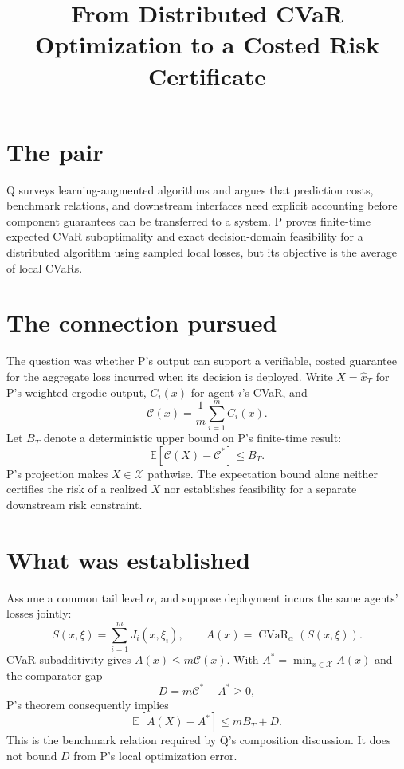 \documentclass{article}
\title{From Distributed CVaR Optimization to a Costed Risk Certificate}
\begin{document}
\maketitle

\section*{The pair}

Q surveys learning-augmented algorithms and argues that prediction costs, benchmark relations, and downstream interfaces need explicit accounting before component guarantees can be transferred to a system. P proves finite-time expected CVaR suboptimality and exact decision-domain feasibility for a distributed algorithm using sampled local losses, but its objective is the average of local CVaRs. 

\section*{The connection pursued}

The question was whether P's output can support a verifiable, costed guarantee for the aggregate loss incurred when its decision is deployed. Write \(X=\hat x_T\) for P's weighted ergodic output, \(C_i(x)\) for agent \(i\)'s CVaR, and
\[
\mathcal C(x)=\frac{1}{m}\sum_{i=1}^m C_i(x).
\]
Let \(B_T\) denote a deterministic upper bound on P's finite-time result:
\[
\mathbb E[\mathcal C(X)-\mathcal C^*]\leq B_T.
\]
P's projection makes \(X\in\mathcal X\) pathwise. The expectation bound alone neither certifies the risk of a realized \(X\) nor establishes feasibility for a separate downstream risk constraint. 

\section*{What was established}

Assume a common tail level \(\alpha\), and suppose deployment incurs the same agents' losses jointly:
\[
S(x,\xi)=\sum_{i=1}^m J_i(x,\xi_i),
\qquad
A(x)=\operatorname{CVaR}_{\alpha}(S(x,\xi)).
\]
CVaR subadditivity gives \(A(x)\leq m\mathcal C(x)\). With \(A^*=\min_{x\in\mathcal X}A(x)\) and the comparator gap
\[
D=m\mathcal C^*-A^*\geq0,
\]
P's theorem consequently implies
\[
\mathbb E[A(X)-A^*]\leq mB_T+D.
\]
This is the benchmark relation required by Q's composition discussion. It does not bound \(D\) from P's local optimization error. 
\end{document}
